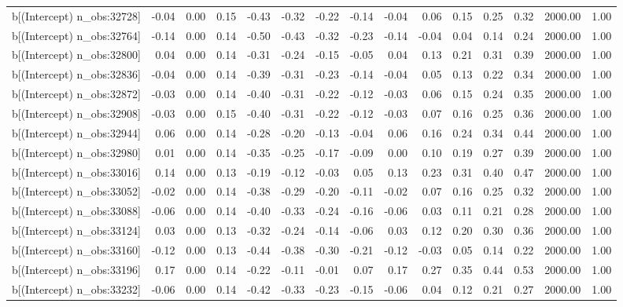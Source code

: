 \begin{table}[ht]
\begin{tabular}{rrrrrrrrrrrrrrr}
  b[(Intercept) n\_obs:32728] & -0.04 & 0.00 & 0.15 & -0.43 & -0.32 & -0.22 & -0.14 & -0.04 & 0.06 & 0.15 & 0.25 & 0.32 & 2000.00 & 1.00 \\ 
  b[(Intercept) n\_obs:32764] & -0.14 & 0.00 & 0.14 & -0.50 & -0.43 & -0.32 & -0.23 & -0.14 & -0.04 & 0.04 & 0.14 & 0.24 & 2000.00 & 1.00 \\ 
  b[(Intercept) n\_obs:32800] & 0.04 & 0.00 & 0.14 & -0.31 & -0.24 & -0.15 & -0.05 & 0.04 & 0.13 & 0.21 & 0.31 & 0.39 & 2000.00 & 1.00 \\ 
  b[(Intercept) n\_obs:32836] & -0.04 & 0.00 & 0.14 & -0.39 & -0.31 & -0.23 & -0.14 & -0.04 & 0.05 & 0.13 & 0.22 & 0.34 & 2000.00 & 1.00 \\ 
  b[(Intercept) n\_obs:32872] & -0.03 & 0.00 & 0.14 & -0.40 & -0.31 & -0.22 & -0.12 & -0.03 & 0.06 & 0.15 & 0.24 & 0.35 & 2000.00 & 1.00 \\ 
  b[(Intercept) n\_obs:32908] & -0.03 & 0.00 & 0.15 & -0.40 & -0.31 & -0.22 & -0.12 & -0.03 & 0.07 & 0.16 & 0.25 & 0.36 & 2000.00 & 1.00 \\ 
  b[(Intercept) n\_obs:32944] & 0.06 & 0.00 & 0.14 & -0.28 & -0.20 & -0.13 & -0.04 & 0.06 & 0.16 & 0.24 & 0.34 & 0.44 & 2000.00 & 1.00 \\ 
  b[(Intercept) n\_obs:32980] & 0.01 & 0.00 & 0.14 & -0.35 & -0.25 & -0.17 & -0.09 & 0.00 & 0.10 & 0.19 & 0.27 & 0.39 & 2000.00 & 1.00 \\ 
  b[(Intercept) n\_obs:33016] & 0.14 & 0.00 & 0.13 & -0.19 & -0.12 & -0.03 & 0.05 & 0.13 & 0.23 & 0.31 & 0.40 & 0.47 & 2000.00 & 1.00 \\ 
  b[(Intercept) n\_obs:33052] & -0.02 & 0.00 & 0.14 & -0.38 & -0.29 & -0.20 & -0.11 & -0.02 & 0.07 & 0.16 & 0.25 & 0.32 & 2000.00 & 1.00 \\ 
  b[(Intercept) n\_obs:33088] & -0.06 & 0.00 & 0.14 & -0.40 & -0.33 & -0.24 & -0.16 & -0.06 & 0.03 & 0.11 & 0.21 & 0.28 & 2000.00 & 1.00 \\ 
  b[(Intercept) n\_obs:33124] & 0.03 & 0.00 & 0.13 & -0.32 & -0.24 & -0.14 & -0.06 & 0.03 & 0.12 & 0.20 & 0.30 & 0.36 & 2000.00 & 1.00 \\ 
  b[(Intercept) n\_obs:33160] & -0.12 & 0.00 & 0.13 & -0.44 & -0.38 & -0.30 & -0.21 & -0.12 & -0.03 & 0.05 & 0.14 & 0.22 & 2000.00 & 1.00 \\ 
  b[(Intercept) n\_obs:33196] & 0.17 & 0.00 & 0.14 & -0.22 & -0.11 & -0.01 & 0.07 & 0.17 & 0.27 & 0.35 & 0.44 & 0.53 & 2000.00 & 1.00 \\ 
  b[(Intercept) n\_obs:33232] & -0.06 & 0.00 & 0.14 & -0.42 & -0.33 & -0.23 & -0.15 & -0.06 & 0.04 & 0.12 & 0.21 & 0.27 & 2000.00 & 1.00 \\ 

\end{tabular}
\end{table}
